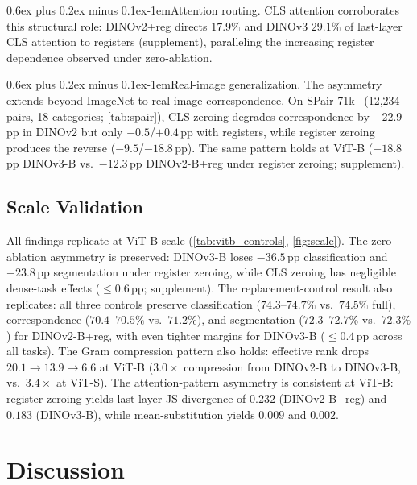 \documentclass[10pt,twocolumn,letterpaper]{article}
\makeatletter
\renewcommand{\paragraph}{\@startsection{paragraph}{4}{\z@}%
  {0.6ex plus 0.2ex minus 0.1ex}{-1em}{\normalfont\normalsize\bfseries}}
\makeatother
\begin{document}
\paragraph{Attention routing.}
CLS attention corroborates this structural role: DINOv2+reg directs $17.9\%$ and DINOv3 $29.1\%$ of last-layer CLS attention to registers (supplement), paralleling the increasing register dependence observed under zero-ablation.

\paragraph{Real-image generalization.}
The asymmetry extends beyond ImageNet to real-image correspondence.
On SPair-71k~\cite{min2019spair} (12{,}234 pairs, 18 categories; \cref{tab:spair}), CLS zeroing degrades correspondence by $-22.9$\,pp in DINOv2 but only $-0.5$/$+0.4$\,pp with registers, while register zeroing produces the reverse ($-9.5$/$-18.8$\,pp).
The same pattern holds at ViT-B ($-18.8$\,pp DINOv3-B vs.\ $-12.3$\,pp DINOv2-B+reg under register zeroing; supplement).

\subsection{Scale Validation}
\label{sec:scale}

All findings replicate at ViT-B scale (\cref{tab:vitb_controls}, \cref{fig:scale}).
The zero-ablation asymmetry is preserved: DINOv3-B loses $-36.5$\,pp classification and $-23.8$\,pp segmentation under register zeroing, while CLS zeroing has negligible dense-task effects (${\leq}0.6$\,pp; supplement).
The replacement-control result also replicates: all three controls preserve classification ($74.3$--$74.7\%$ vs.\ $74.5\%$ full), correspondence ($70.4$--$70.5\%$ vs.\ $71.2\%$), and segmentation ($72.3$--$72.7\%$ vs.\ $72.3\%$) for DINOv2-B+reg, with even tighter margins for DINOv3-B (${\leq}0.4$\,pp across all tasks).
The Gram compression pattern also holds: effective rank drops $20.1 \to 13.9 \to 6.6$ at ViT-B ($3.0{\times}$ compression from DINOv2-B to DINOv3-B, vs.\ $3.4{\times}$ at ViT-S).
The attention-pattern asymmetry is consistent at ViT-B: register zeroing yields last-layer JS divergence of $0.232$ (DINOv2-B+reg) and $0.183$ (DINOv3-B), while mean-substitution yields $0.009$ and $0.002$.

\section{Discussion}
\label{sec:discussion}
\end{document}
